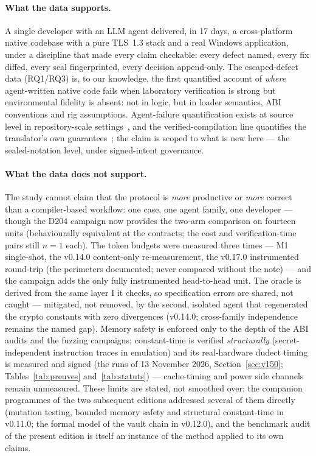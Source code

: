 \documentclass[11pt,a4paper]{article}
\begin{document}
\paragraph{What the data supports.} A single developer with an LLM agent
delivered, in 17 days, a cross-platform native codebase with a pure
TLS~1.3 stack and a real Windows application, under a discipline that
made every claim checkable: every defect named, every fix diffed, every
seal fingerprinted, every decision append-only. The escaped-defect data
(RQ1/RQ3) is, to our knowledge, the first quantified account of
\emph{where} agent-written native code fails when laboratory verification
is strong but environmental fidelity is absent: not in logic, but in
loader semantics, ABI conventions and rig assumptions. Agent-failure
quantification exists at source level in repository-scale
settings~\cite{yang2024sweagent}, and the verified-compilation line
quantifies the translator's own guarantees~\cite{leroycompcert}; the
claim is scoped to what is new here --- the sealed-notation level, under
signed-intent governance.

\paragraph{What the data does not support.} The study cannot claim that
the protocol is \emph{more} productive or \emph{more} correct than a
compiler-based workflow: one case, one agent family, one developer ---
though the D204 campaign now provides the two-arm comparison on fourteen
units (behaviourally equivalent at the contracts; the cost and
verification-time pairs still $n{=}1$ each). The token budgets were
measured three times --- M1 single-shot, the v0.14.0 content-only
re-measurement, the v0.17.0 instrumented round-trip (the perimeters
documented; never compared without the note) --- and the campaign adds
the only fully instrumented head-to-head unit. The oracle is derived
from the same layer I it checks, so
specification errors are shared, not caught --- mitigated, not removed,
by the second, isolated agent that regenerated the crypto constants
with zero divergences (v0.14.0; cross-family independence remains the
named gap). Memory safety is enforced
only to the depth of the ABI audits and the fuzzing campaigns;
constant-time is verified \emph{structurally} (secret-independent
instruction traces in emulation) and its real-hardware dudect timing is
measured and signed (the runs of 13 November 2026,
Section~\ref{sec:v150}; Tables~\ref{tab:preuves} and~\ref{tab:statuts})
--- cache-timing and power side channels remain unmeasured. These limits
are stated, not smoothed over; the companion
programmes of the two subsequent editions addressed several of them
directly (mutation testing, bounded memory safety and structural
constant-time in v0.11.0; the formal model of the vault chain in
v0.12.0), and the benchmark audit of the present edition is itself an
instance of the method applied to its own claims.
\end{document}
